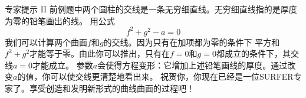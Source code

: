 ﻿\begin{surferPage}{专家提示 II}
前例题中两个圆柱的交线是一条无穷细直线。无穷细直线指的是厚度为零的铅笔画出的线。
用公式
\[ f^2+g^2-a=0\]
我们可以计算两个曲面$f$和$g$的交线。因为只有在加项都为零的条件下
平方和$f^2+g^2$才能等于零。由此你可以推出，只有在$f=0$和$g=0$都成立的条件下，其交线$a=0$才能成立。
参数$a$会使得方程变形：它增加上述铅笔画线的厚度。通过改变$a$的值，你可以使交线更清楚地看出来。
\newline \newline
祝贺你，你现在已经是一位SURFER专家了。享受创造和发明新形式的曲线曲面的过程吧！
\end{surferPage}

